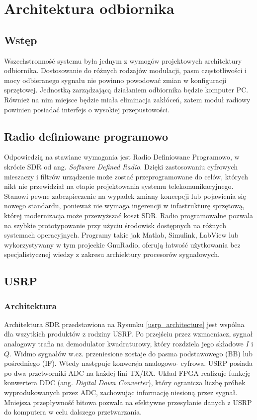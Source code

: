 \chapter{Architektura odbiornika}

\section{Wstęp}
Wszechstronność systemu była jednym z wymogów projektowych architektury odbiornika. 
Dostosowanie do różnych rodzajów modulacji, pasm częstotliwości i mocy odbieranego sygnału nie powinno powodować zmian w konfiguracji sprzętowej.
Jednostką zarządzającą działaniem odbiornika będzie komputer PC.
Również na nim miejsce będzie miała eliminacja zakłóceń, zatem moduł radiowy powinien posiadać interfejs o wysokiej przepustowości.

\section{Radio definiowane programowo}
Odpowiedzią na stawiane wymagania jest Radio Definiowane Programowo, w skrócie SDR od ang. \textit{Software Defined Radio}.
Dzięki zastosowaniu cyfrowych mieszaczy i filtrów urządzenie może zostać przeprogramowane do celów, których nikt nie przewidział na etapie projektowania systemu telekomunikacyjnego.
Stanowi pewne zabezpieczenie na wypadek zmiany koncepcji lub pojawienia się nowego standardu, ponieważ nie wymaga ingerencji w infastrukturę sprzętową, której modernizacja może przewyższać koszt SDR.
Radio programowalne pozwala na szybkie prototypowanie przy użyciu środowisk dostępnych na różnych systemach operacyjnych. 
Programy takie jak Matlab, Simulink, LabView lub wykorzystywany w tym projeckie GnuRadio, oferują łatwość użytkowania bez specjalistycznej wiedzy z zakresu archiektury procesorów sygnałowych. \cite{ImplementingSDR:92304} 

\section{USRP}
\subsection{Architektura}
Architektura SDR przedstawiona na Rysunku \ref{usrp_architecture} jest wspólna dla wszytkich produktów z rodziny USRP. Po przejściu przez wzmacniacz, sygnał analogowy trafia na demodulator kwadraturowy, który rozdziela jego składowe $I$ i $Q$. 
Widmo sygnałów w.cz. przeniesione zostaje do pasma podstawowego (BB) lub pośredniego (IF). 
Wtedy następuje konwersja analogowo- cyfrowa. 
USRP posiada po dwa przetworniki ADC na każdej lini TX/RX.
Układ FPGA realizuje funkcję konwertera DDC (ang. \textit{Digital Down Converter}), który ogranicza liczbę próbek wyprodukowanych przez ADC, zachowując informację niesioną przez sygnał.
Mniejsza przepływność bitowa pozwala na efektywne przesyłanie danych z USRP do komputera w celu dalszego przetwarzania. \cite{usrp_bw}

